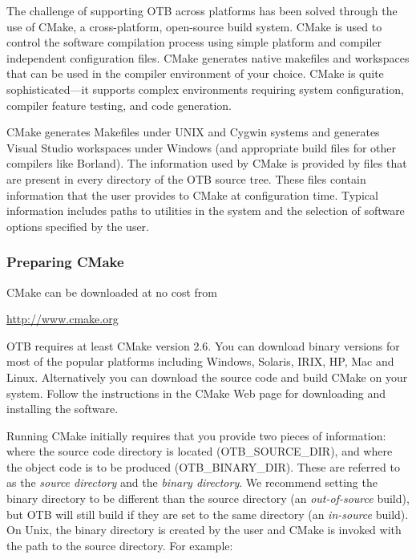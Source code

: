 The challenge of supporting OTB across platforms has been solved through the
use of CMake, a cross-platform, open-source build system. CMake is used to
control the software compilation process using simple platform and compiler
independent configuration files.  CMake generates native makefiles and
workspaces that can be used in the compiler environment of your choice. CMake
is quite sophisticated---it supports complex environments requiring system
configuration, compiler feature testing, and code generation.

CMake generates Makefiles under UNIX and Cygwin systems and generates Visual
Studio workspaces under Windows (and appropriate build files for other
compilers like Borland). The information used by CMake is provided by
 files that are present in every directory of the OTB
source tree. These files contain information that the user
provides to CMake at configuration time. Typical information includes paths
to utilities in the system and the selection of software options specified by
the user.

\subsubsection{Preparing CMake}
\label{sec:CMakeforOTB}


CMake can be downloaded at no cost from
\begin{center}
  \url{http://www.cmake.org}
\end{center}

OTB requires at least CMake version 2.6. You can download binary
versions for most of the popular platforms including Windows, Solaris,
IRIX, HP, Mac and Linux. Alternatively you can download the source
code and build CMake on your system. Follow the instructions in the
CMake Web page for downloading and installing the software.

Running CMake initially requires that you provide two pieces of
information: where the source code directory is located
(OTB\_SOURCE\_DIR), and where the object code is to be produced
(OTB\_BINARY\_DIR). These are referred to as the \emph{source
directory} and the \emph{binary directory}. We recommend setting the
binary directory to be different than the source directory (an
\emph{out-of-source} build), but OTB will still build if they are set
to the same directory (an \emph{in-source} build).  On Unix, the
binary directory is created by the user and CMake is invoked with the
path to the source directory. For example:

